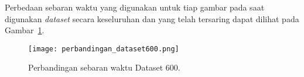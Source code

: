 Perbedaan sebaran waktu yang digunakan untuk tiap gambar pada saat digunakan \textit{dataset} secara keseluruhan dan yang telah tersaring dapat dilihat pada Gambar~\ref{fig:perbandingan_dataset600}.

\begin{figure}[H]
	\centering
	\texttt{[image: perbandingan\_dataset600.png]}
	\caption{Perbandingan sebaran waktu Dataset 600.}
	\label{fig:perbandingan_dataset600}
\end{figure}

